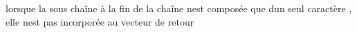 
\begin{DoxyRefList}
\item[Membre \mbox{\hyperlink{_other_8hpp_ab351d32f7fd9513c0aded3250cc2f921}{Yack\+Terminal\+::string\+Split}} (const std\+::string \&str, char delim)]\label{bug__bug000001}%
%
lorsque la sous chaîne à la fin de la chaîne n\textquotesingle{}est composée que d\textquotesingle{}un seul caractère , elle n\textquotesingle{}est pas incorporée au vecteur de retour 
\end{DoxyRefList}